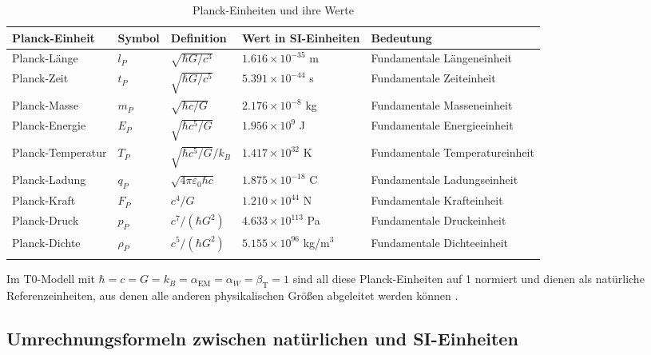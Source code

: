 \documentclass[12pt,a4paper]{article}
\newcommand{\alphaEM}{\alpha_{\text{EM}}}
\newcommand{\betaT}{\beta_{\text{T}}}
\begin{document}
	\begin{table}[ht]
		\centering
		\begin{adjustbox}{scale=0.75}
			\begin{tabular}{lllll}
				\hline
				\textbf{Planck-Einheit} & \textbf{Symbol} & \textbf{Definition} & \textbf{Wert in SI-Einheiten} & \textbf{Bedeutung} \\
				\hline
				Planck-Länge & $l_P$ & $\sqrt{\hbar G/c^3}$ & $1.616 \times 10^{-35}$ m & Fundamentale Längeneinheit \\
				Planck-Zeit & $t_P$ & $\sqrt{\hbar G/c^5}$ & $5.391 \times 10^{-44}$ s & Fundamentale Zeiteinheit \\
				Planck-Masse & $m_P$ & $\sqrt{\hbar c/G}$ & $2.176 \times 10^{-8}$ kg & Fundamentale Masseneinheit \\
				Planck-Energie & $E_P$ & $\sqrt{\hbar c^5/G}$ & $1.956 \times 10^9$ J & Fundamentale Energieeinheit \\
				Planck-Temperatur & $T_P$ & $\sqrt{\hbar c^5/G}/k_B$ & $1.417 \times 10^{32}$ K & Fundamentale Temperatureinheit \\
				Planck-Ladung & $q_P$ & $\sqrt{4\pi\varepsilon_0\hbar c}$ & $1.875 \times 10^{-18}$ C & Fundamentale Ladungseinheit \\
				Planck-Kraft & $F_P$ & $c^4/G$ & $1.210 \times 10^{44}$ N & Fundamentale Krafteinheit \\
				Planck-Druck & $p_P$ & $c^7/(\hbar G^2)$ & $4.633 \times 10^{113}$ Pa & Fundamentale Druckeinheit \\
				Planck-Dichte & $\rho_P$ & $c^5/(\hbar G^2)$ & $5.155 \times 10^{96}$ kg/m$^3$ & Fundamentale Dichteeinheit \\
				\hline
				\multicolumn{4}{c}{} \\
				\hline
			\end{tabular}
		\end{adjustbox}
		\caption{Planck-Einheiten und ihre Werte}
		\label{tab:planck_units}
	\end{table}
	
	Im T0-Modell mit $\hbar = c = G = k_B = \alphaEM = \alpha_W = \betaT = 1$ sind all diese Planck-Einheiten auf 1 normiert und dienen als natürliche Referenzeinheiten, aus denen alle anderen physikalischen Größen abgeleitet werden können \cite{pascher_planck_2025}.
	
	\subsection{Umrechnungsformeln zwischen natürlichen und SI-Einheiten}
	
\end{document}
